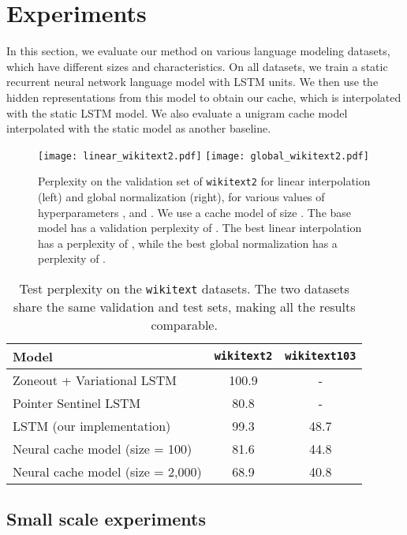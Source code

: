 \documentclass{article} \usepackage{iclr2017_conference,times}
\begin{document}
\section{Experiments}

In this section, we evaluate our method on various language modeling datasets, which have different sizes and characteristics.
On all datasets, we train a static recurrent neural network language model with LSTM units.
We then use the hidden representations from this model to obtain our cache, which is interpolated with the static LSTM model.
We also evaluate a unigram cache model interpolated with the static model as another baseline.

\begin{figure}
  \centering
  \texttt{[image: linear\_wikitext2.pdf]}
  \texttt{[image: global\_wikitext2.pdf]}

  \vspace{-0.5cm}
  \caption{Perplexity on the validation set of \texttt{wikitext2} for linear interpolation (left) and global normalization (right), for various values of hyperparameters ,  and .
    We use a cache model of size . The base model has a validation perplexity of .
    The best linear interpolation has a perplexity of , while the best global normalization has a perplexity of .}
  \label{fig:wikitext2}
\end{figure}

\begin{table}
  \small
  \centering
  \begin{tabular}{lcc}
    \toprule
    Model & \texttt{wikitext2} & \texttt{wikitext103} \\
    \midrule
    Zoneout + Variational LSTM~\citep{merity2016pointer}  & 100.9 & - \\
    Pointer Sentinel LSTM~\citep{merity2016pointer}       & 80.8  & - \\
    \midrule
    LSTM (our implementation)         & 99.3 & 48.7 \\
    Neural cache model (size = 100)   & 81.6 & 44.8 \\
    Neural cache model (size = 2,000) & 68.9 & 40.8 \\
    \bottomrule
  \end{tabular}
  \caption{Test perplexity on the \texttt{wikitext} datasets. The two datasets share the same validation and test sets, making all the results comparable.}
  \label{tab:wikitext}
\end{table}

\subsection{Small scale experiments}
\end{document}
